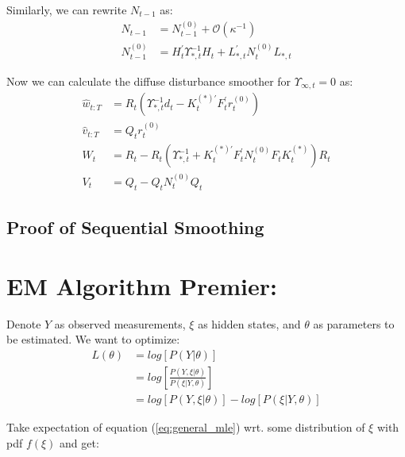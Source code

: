 \documentclass[12pt]{article}
\numberwithin{equation}{section}
\begin{document}
Similarly, we can rewrite $N_{t-1}$ as:
\begin{align}
    N_{t-1} &= N_{t-1}^{(0)} + \mathcal{O}(\kappa^{-1}) \nonumber \\
    N_{t-1}^{(0)} &= H_t^{'}\Upsilon_{*,t}^{-1}H_t + L_{*,t}^{'}N_t^{(0)}L_{*,t} 
\end{align}

Now we can calculate the diffuse disturbance smoother for $\Upsilon_{\infty,t}=0$ as:
\begin{align}
    \hat{w}_{t:T} &= R_t(\Upsilon_{*,t}^{-1}d_t - K_t^{(*)'}F_t^{'}r_t^{(0)}) \\
    \hat{v}_{t:T} &= Q_tr_t^{(0)} \\
    W_t &= R_t - R_t(\Upsilon_{*,t}^{-1} + K_t^{(*)'}F_t^{'}N_t^{(0)}F_tK_t^{(*)})R_t \\
    V_t &= Q_t - Q_tN_t^{(0)}Q_t \label{eq:diff_disturb0_end}
\end{align}













\subsection{Proof of Sequential Smoothing}

\section{EM Algorithm Premier:} \label{ap:EM_proof}
Denote $Y$ as observed measurements, $\xi$ as hidden states, and $\theta$ as parameters to be estimated. We want to optimize:
\begin{align}
    L(\theta) & = log[P(Y|\theta)] \nonumber \\
    & = log\left[\frac{P(Y,\xi|\theta)}{P(\xi|Y,\theta)}\right] \nonumber \\
    & = log[P(Y,\xi|\theta)] - log[P(\xi|Y,\theta)] \label{eq:general_mle}
\end{align}

Take expectation of equation (\ref{eq:general_mle}) wrt. some distribution of $\xi$ with pdf $f(\xi)$ and get:
\end{document}
